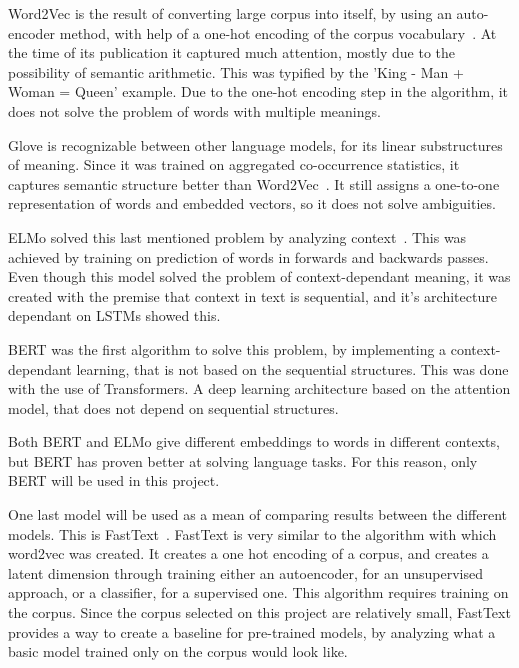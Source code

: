 Word2Vec is the result of converting large corpus into itself, by using an auto-encoder method, with help of a one-hot encoding of the corpus vocabulary~\cite{mikolov2013word2vec}. At the time of its publication it captured much attention, mostly due to the possibility of semantic arithmetic. This was typified by the 'King - Man + Woman = Queen' example. Due to the one-hot encoding step in the algorithm, it does not solve the problem of words with multiple meanings.

Glove is recognizable between other language models, for its linear substructures of meaning. Since it was trained on aggregated co-occurrence statistics, it captures semantic structure better than Word2Vec~\cite{penningto2014glove}. %
It still assigns a one-to-one representation of words and embedded vectors, so it does not solve ambiguities.

ELMo solved this last mentioned problem by analyzing context~\cite{peters2018elmo}. %
This was achieved by training on prediction of words in forwards and backwards passes. Even though this model solved the problem of context-dependant meaning, it was created with the premise that context in text is sequential, and it's architecture dependant on LSTMs showed this.

BERT was the first algorithm to solve this problem, by implementing a context-dependant learning, that is not based on the sequential structures. This was done with the use of Transformers. A deep learning architecture based on the attention model, that does not depend on sequential structures.

Both BERT and ELMo give different embeddings to words in different contexts, but BERT has proven better at solving language tasks. For this reason, only BERT will be used in this project.

One last model will be used as a mean of comparing results between the different models. This is FastText~\cite{joulin2017fasttext}. FastText is very similar to the algorithm with which word2vec was created. It creates a one hot encoding of a corpus, and creates a latent dimension through training either an autoencoder, for an unsupervised approach, or a classifier, for a supervised one. This algorithm requires training on the corpus. Since the corpus selected on this project are relatively small, FastText provides a way to create a baseline for pre-trained models, by analyzing what a basic model trained only on the corpus would look like.

